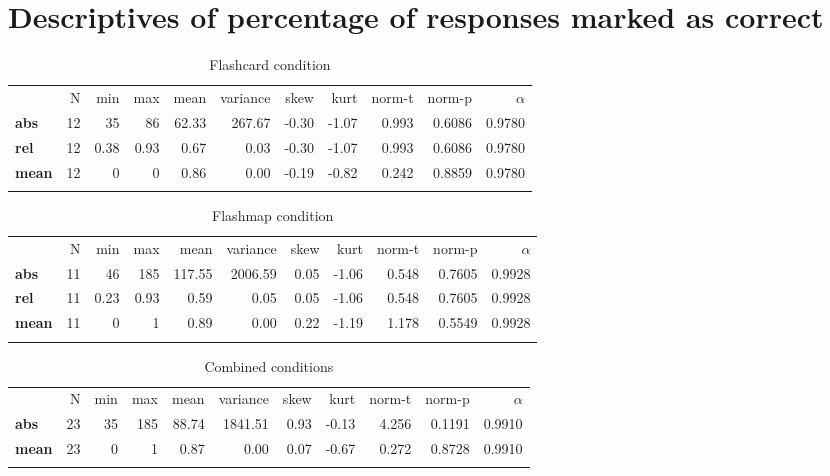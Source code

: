 \FloatBarrier
\section{Descriptives of percentage of responses marked as correct}

\begin{longtable}[c]{@{}lrrrrrrrrrr@{}}
\caption{Flashcard condition}
\endfirsthead
\toprule\addlinespace
& N & min & max & mean & variance & skew & kurt & norm-t &
norm-p & $\alpha$
\\\addlinespace
\midrule
\textbf{abs} & 12 & 35 & 86 & 62.33 & 267.67 & -0.30 & -1.07 & 0.993 &
0.6086 & 0.9780
\\\addlinespace
\textbf{rel} & 12 & 0.38 & 0.93 & 0.67 & 0.03 & -0.30 & -1.07 & 0.993 & 0.6086
& 0.9780
\\\addlinespace
\textbf{mean} & 12 & 0 & 0 & 0.86 & 0.00 & -0.19 & -0.82 & 0.242 &
0.8859 & 0.9780
\\\addlinespace
\bottomrule
    \label{tab:score_fc}
\end{longtable}

\begin{longtable}[c]{@{}lrrrrrrrrrr@{}}
\caption{Flashmap condition}
\endfirsthead
\toprule\addlinespace
& N & min & max & mean & variance & skew & kurt & norm-t &
norm-p & $\alpha$
\\\addlinespace
\midrule
\textbf{abs} & 11 & 46 & 185 & 117.55 & 2006.59 & 0.05 & -1.06 & 0.548 &
0.7605 & 0.9928
\\\addlinespace
\textbf{rel} & 11 & 0.23 & 0.93 & 0.59 & 0.05 & 0.05 & -1.06 & 0.548 & 0.7605
& 0.9928
\\\addlinespace
\textbf{mean} & 11 & 0 & 1 & 0.89 & 0.00 & 0.22 & -1.19 & 1.178 & 0.5549
& 0.9928
\\\addlinespace
\bottomrule
    \label{tab:score_fm}
\end{longtable}

\begin{longtable}[c]{@{}lrrrrrrrrrr@{}}
\caption{Combined conditions}
\endfirsthead
\toprule\addlinespace
& N & min & max & mean & variance & skew & kurt & norm-t &
norm-p & $\alpha$
\\\addlinespace
\midrule
\textbf{abs} & 23 & 35 & 185 & 88.74 & 1841.51 & 0.93 & -0.13 & 4.256 & 0.1191 & 0.9910
\\\addlinespace
\textbf{mean} & 23 & 0 & 1 & 0.87 & 0.00 & 0.07 & -0.67 & 0.272 & 0.8728
& 0.9910
\\\addlinespace
\bottomrule
    \label{tab:score_gen}
\end{longtable}

